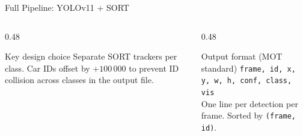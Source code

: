 \documentclass[aspectratio=169]{beamer}
\begin{document}
\begin{frame}{Full Pipeline: YOLOv11 + SORT}
  \vspace{0.4em}
  \begin{columns}[T]
    \begin{column}{0.48\textwidth}
      \begin{block}{Key design choice}
        \small Separate SORT trackers per class.
        Car IDs offset by $+100\,000$ to prevent
        ID collision across classes in the output file.
      \end{block}
    \end{column}
    \begin{column}{0.48\textwidth}
      \begin{block}{Output format (MOT standard)}
        \scriptsize
        \texttt{frame, id, x, y, w, h, conf, class, vis}\\
        One line per detection per frame.
        Sorted by \texttt{(frame, id)}.
      \end{block}
    \end{column}
  \end{columns}
\end{frame}
\end{document}
